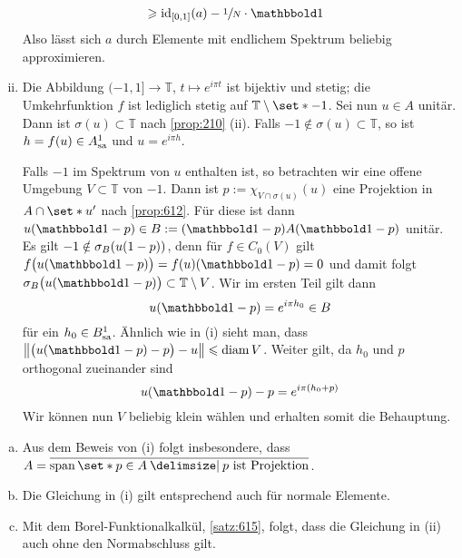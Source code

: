 \begin{beweis}
\begin{enumerate}[(i)]
\begin{align}
			&\ge \id_{[0,1]}(a) - \sfrac{1}{N} \cdot \ind 
		\end{align}
		Also lässt sich $a$ durch Elemente mit endlichem Spektrum beliebig approximieren.
		\item Die Abbildung $(-1,1] \to \mathbb{T}$, $t \mapsto e^{i \pi t}$ ist bijektiv und stetig; die Umkehrfunktion $f$ ist lediglich stetig auf $\mathbb{T} \setminus \set*{-1}$.
		Sei nun $u \in A$ unitär. 
		Dann ist $\sigma(u) \subset \mathbb{T}$ nach \autoref{prop:210} (ii).
		Falls $-1 \notin \sigma(u) \subset \mathbb{T}$, so ist $h=f(u) \in A_{\mathrm{sa}}^1$ und $u=e^{i \pi h}$.
		
		Falls $-1$ im Spektrum von $u$ enthalten ist, so betrachten wir eine offene Umgebung $V \subset \mathbb{T}$ von $-1$.
		Dann ist $p:= \chi_{V\cap \sigma(u)}(u)$ eine Projektion in $A \cap \set*{u}'$ nach \autoref{prop:612}.
		Für diese ist dann $u(\ind-p) \in B := (\ind-p)A(\ind-p)$ unitär.
		Es gilt $-1 \notin \sigma_B \enbrace*{u(1-p)}$, denn für $f \in C_0(V)$ gilt $f \enbrace[\big]{u(\ind-p)}= f(u)(\ind-p)=0$ und damit folgt $\sigma_B \enbrace[\big]{u(\ind-p)} \subset \mathbb{T}\setminus V$.
		Wir im ersten Teil gilt dann
		\[
			u(\ind-p)= e^{i \pi h_0} \in B
		\]
		für ein $h_0 \in B_{\mathrm{sa}}^1$. 
		Ähnlich wie in (i) sieht man, dass 
		\(
			\norm*{\enbrace[\big]{u(\ind-p) -p} -u} \le \diam V
		\).
		Weiter gilt, da $h_0$ und $p$ orthogonal zueinander sind
		\[
			u(\ind-p) - p = e^{i \pi(h_0+p)} 
		\]
		Wir können nun $V$ beliebig klein wählen und erhalten somit die Behauptung.\qedhere
	\end{enumerate}
\end{beweis}

\begin{bemerkung}[{name=[Folgerungen aus \autoref{korr:613}]}]
	\leavevmode
	\begin{enumerate}[a),itemsep=0pt]
		\item Aus dem Beweis von (i) folgt insbesondere, dass $A= \overline{\Span \set*{p \in A \given p\text{ ist Projektion}}}$.
		\item Die Gleichung in (i) gilt entsprechend auch für normale Elemente.
		\item Mit dem Borel-Funktionalkalkül, \autoref{satz:615}, folgt, dass die Gleichung in (ii) auch ohne den Normabschluss gilt.
	\end{enumerate}
\end{bemerkung}

